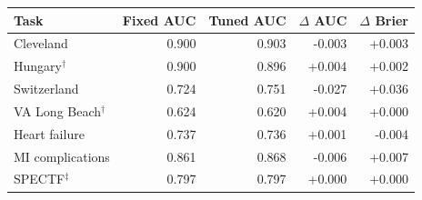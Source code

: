 \begin{tabular}{lrrrr}
\toprule
Task & Fixed AUC & Tuned AUC & $\Delta$ AUC & $\Delta$ Brier \\
\midrule
Cleveland & 0.900 & 0.903 & -0.003 & +0.003 \\
Hungary$^{\dagger}$ & 0.900 & 0.896 & +0.004 & +0.002 \\
Switzerland & 0.724 & 0.751 & -0.027 & +0.036 \\
VA Long Beach$^{\dagger}$ & 0.624 & 0.620 & +0.004 & +0.000 \\
Heart failure & 0.737 & 0.736 & +0.001 & -0.004 \\
MI complications & 0.861 & 0.868 & -0.006 & +0.007 \\
SPECTF$^{\ddagger}$ & 0.797 & 0.797 & +0.000 & +0.000 \\
\bottomrule
\end{tabular}
